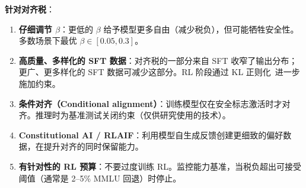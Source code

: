 \textbf{针对对齐税}：

\begin{enumerate}
  \item \textbf{仔细调节 $\beta$}：更低的 $\beta$ 给予模型更多自由（减少税负），但可能牺牲安全性。多数场景下最优 $\beta \in [0.05, 0.3]$。
  \item \textbf{高质量、多样化的 SFT 数据}：对齐税的一部分来自 SFT 收窄了输出分布；更广、更多样化的 SFT 数据可减少这部分。RL 阶段通过 KL 正则化~\cite{ouyang2022training}进一步施加约束。
  \item \textbf{条件对齐（Conditional alignment）}：训练模型仅在安全标志激活时才对齐。推理时为基准测试关闭约束（仅供研究使用的技术）。
  \item \textbf{Constitutional AI / RLAIF}：利用模型自生成反馈创建更细致的偏好数据，在提升对齐的同时保留能力。
  \item \textbf{有针对性的 RL 预算}：不要过度训练 RL。监控能力基准，当税负超出可接受阈值（通常是 2--5\% MMLU 回退）时停止。
\end{enumerate}

